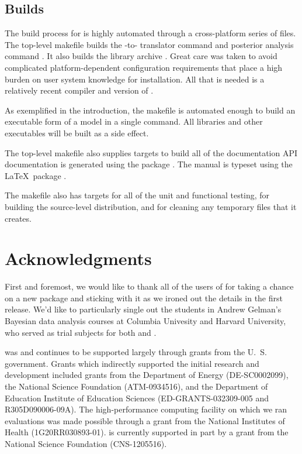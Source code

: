 \documentclass[article]{jss}
\begin{document}
\subsection{Builds}

The build process for  is highly automated through a
cross-platform series of  files.  The top-level makefile
builds the -to- translator command
 and posterior analysis command .  It
also builds the library archive .  Great care was
taken to avoid complicated platform-dependent configuration
requirements that place a high burden on user system knowledge for
installation.  All that is needed is a relatively recent
 compiler and version of .

As exemplified in the introduction, the makefile is automated enough
to build an executable form of a  model in a single
command.  All libraries and other executables will be built as a side
effect.  

The top-level makefile also supplies targets to build all of the
documentation  API documentation is generated using the
 package \citep{Doxygen:2011}.  The 
manual \citep{Stan:2013} is typeset using the \LaTeX\ package
\citep{MittelbachEtAl:2004}.

The makefile also has targets for all of the unit and functional
testing, for building the source-level distribution, and for cleaning
any temporary files that it creates.

\section*{Acknowledgments}

First and foremost, we would like to thank all of the users of
 for taking a chance on a new package and sticking with
it as we ironed out the details in the first release.  We'd like to
particularly single out the students in Andrew Gelman's Bayesian data
analysis courses at Columbia Univesity and Harvard University, who
served as trial subjects for both  and \citep{GelmanEtAl:2013}.

 was and continues to be supported largely through grants from the
U.~S. government.  Grants which indirectly supported the initial
research and development included grants from the Department of Energy
(DE-SC0002099), the National Science Foundation (ATM-0934516), and the
Department of Education Institute of Education Sciences
(ED-GRANTS-032309-005 and R305D090006-09A).  The high-performance
computing facility on which we ran evaluations was made possible
through a grant from the National Institutes of Health
(1G20RR030893-01).   is currently supported in part by a grant
from the National Science Foundation (CNS-1205516).
\end{document}
